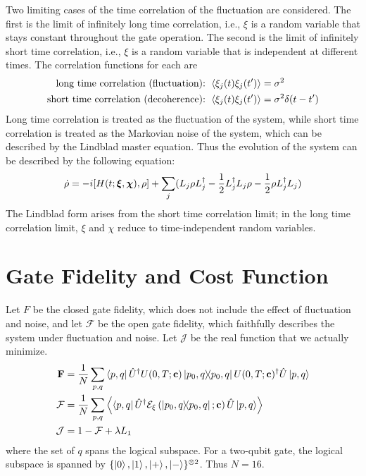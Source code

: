 \documentclass{notes2}
\newcommand{\closef}{\mathbf{F}}
\newcommand{\openf}{\mathcal{F}}
\begin{document}
Two limiting cases of the time correlation of the fluctuation are considered. The first is the limit of infinitely long time correlation, i.e., $\xi$ is a random variable that stays constant throughout the gate operation. The second is the limit of infinitely short time correlation, i.e., $\xi$ is a random variable that is independent at different times.
The correlation functions for each are
\begin{align}
    \text{long time correlation (fluctuation): } &\expval{\xi_j(t)\xi_j(t')} = \sigma^2 \\
    \text{short time correlation (decoherence): } &\expval{\xi_j(t)\xi_j(t')} = \sigma^2 \delta(t - t')
\end{align}
Long time correlation is treated as the fluctuation of the system, while short time correlation is treated as the Markovian noise of the system, which can be described by the Lindblad master equation.
Thus the evolution of the system can be described by the following equation:
\begin{equation}
    \dot \rho = -i[H(t; \vb* \xi, \vb* \chi), \rho] + \sum_j  (L_j \rho L_j^\dagger - \frac{1}{2} L_j^\dagger L_j \rho - \frac{1}{2} \rho L_j^\dagger L_j)
\end{equation}
The Lindblad form arises from the short time correlation limit; in the long time correlation limit, $\xi$ and $\chi$ reduce to time-independent random variables.

\section{Gate Fidelity and Cost Function}
Let $F$ be the closed gate fidelity, which does not include the effect of fluctuation and noise, and let $\mathcal{F}$ be the open gate fidelity, which faithfully describes the system under fluctuation and noise. Let $\mathcal{J}$ be the real function that we actually minimize.
\begin{align*}
    \closef &= \frac{1}{N} \sum_{p,q}\bra{p,q}\hat U^\dagger U(0, T; \vb c)\ketbra{p_0,q} U(0, T; \vb c)^\dagger \hat U \ket{p,q}\\
    \openf &= \frac{1}{N} \sum_{p,q}\expval{\bra{p,q}\hat U^\dagger {\mathcal{E}_\xi}\left(\ketbra{p_0,q};\vb c\right)\hat U \ket{p,q}}\\
    \mathcal{J} &= 1 - \openf + \lambda L_1
\end{align*}
where the set of $q$ spans the logical subspace. For a two-qubit gate, the logical subspace is spanned by $\{\ket{0}, \ket{1}, \ket{+}, \ket{-}\}^{\otimes 2}$. Thus $N = 16$.
\end{document}
